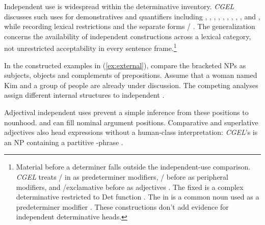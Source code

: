 \documentclass[12pt]{article}
\begin{document}
Independent use is widespread within the determinative inventory. \textit{CGEL} discusses such uses for demonstratives and quantifiers including , , , , , , , , ,  and , while recording lexical restrictions and the separate forms / \citep[371--372, 410--424]{huddleston2002}. The generalization concerns the availability of independent constructions across a lexical category, not unrestricted acceptability in every sentence frame.\footnote{Material before a determiner falls outside the independent-use comparison. \textit{CGEL} treats / in  as predeterminer modifiers, / before  as peripheral modifiers, and /exclamative  before  as adjectives \citep[433--437]{huddleston2002}. The fixed  is a complex determinative restricted to Det function \citep[394]{huddleston2002}. The  in  is a common noun used as a predeterminer modifier \citep[434]{huddleston2002}. These constructions don't add evidence for independent determinative heads.}

In the constructed examples in (\ref{ex:external}), compare the bracketed NPs as subjects, objects and complements of prepositions. Assume that a woman named Kim and a group of people are already under discussion. The competing analyses assign different internal structures to independent .

\begin{samepage}
\ea\label{ex:external}
\ea {}\qquad {}\qquad {}
\ex {}\qquad {}\qquad {}
\ex {}\qquad {}\qquad {}
\ex {}\qquad {}\qquad {}
\z\z
\end{samepage}

Adjectival independent uses prevent a simple inference from these positions to nounhood.  and  can fill nominal argument positions. Comparative and superlative adjectives also head expressions without a human-class interpretation: \textit{CGEL}'s  is an NP containing a partitive -phrase \citep[332--333, 416--423]{huddleston2002}.
\end{document}
